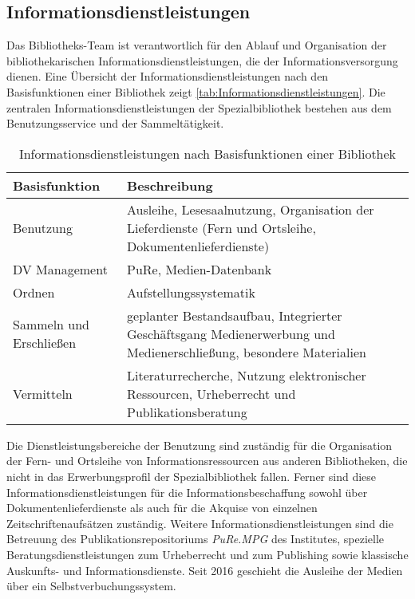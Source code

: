 \subsection{Informationsdienstleistungen}
Das Bibliotheks-Team ist verantwortlich für den Ablauf und Organisation der bibliothekarischen Informationsdienstleistungen, 
die der Informationsversorgung dienen. Eine Übersicht der Informationsdienstleistungen nach den Basisfunktionen\cite[S. 204 f.]{RN200} einer Bibliothek 
zeigt \autoref{tab:Informationsdienstleistungen}. Die zentralen Informationsdienstleistungen der Spezialbibliothek bestehen 
aus dem Benutzungsservice und der Sammeltätigkeit. 
\begingroup
\setlength{\tabcolsep}{12pt} %
\renewcommand{\arraystretch}{1.5} 
\begin{table}[h]
    \centering
    \begin{adjustbox}{max width=\textwidth}
    \begin{tabular}{p{}p{}}
       \toprule
       \textbf{Basisfunktion}          & \textbf{Beschreibung}\\
       \midrule
        Benutzung                               &Ausleihe, Lesesaalnutzung, Organisation der Lieferdienste (Fern und Ortsleihe, Dokumentenlieferdienste)\\
        DV Management                           &PuRe, Medien-Datenbank\\
        Ordnen                                  &Aufstellungssystematik\\
        Sammeln und Erschließen                 &geplanter Bestandsaufbau, Integrierter Geschäftsgang Medienerwerbung und Medienerschließung, besondere Materialien\\
        Vermitteln                              &Literaturrecherche, Nutzung elektronischer Ressourcen, Urheberrecht und Publikationsberatung\\
   
       \bottomrule
    \end{tabular}
    \end{adjustbox}
    \caption{%
        Informationsdienstleistungen nach Basisfunktionen einer Bibliothek
    }
    \label{tab:Informationsdienstleistungen}
    \end{table}
\endgroup

Die Dienstleistungsbereiche der Benutzung sind zuständig für die Organisation der Fern- und Ortsleihe von Informationsressourcen 
aus anderen Bibliotheken, die nicht in das Erwerbungsprofil der Spezialbibliothek fallen. Ferner sind 
diese Informationsdienstleistungen für die Informationsbeschaffung sowohl über Dokumentenlieferdienste als auch für die 
Akquise von einzelnen Zeitschriftenaufsätzen zuständig. Weitere Informationsdienstleistungen sind
die Betreuung des Publikationsrepositoriums \textit{PuRe.MPG} des Institutes, spezielle Beratungsdienstleistungen 
zum Urheberrecht und zum Publishing sowie klassische Auskunfts- und Informationsdienste. Seit 2016 geschieht die Ausleihe der
Medien über ein Selbstverbuchungssystem.


